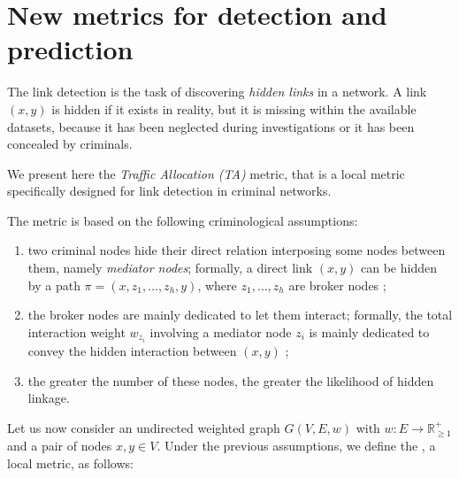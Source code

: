 \section{New metrics for detection and prediction}
\label{sec:new-metrics}

The link detection is the task of discovering \textit{hidden links} in a network. 
A link $(x,y)$ is hidden if it exists in reality, but it is missing within the available datasets, because it has been neglected during investigations or it has been concealed by criminals.

We present here the \textit{Traffic Allocation (TA)}  metric, that is a local metric specifically designed for link detection in criminal networks.
 
The metric is based on the following criminological assumptions: 

\begin{enumerate}
	\item two criminal nodes hide their direct relation interposing some nodes between them, namely \textit{mediator nodes}; formally, a direct link $(x,y)$ can be hidden by a path $\pi=(x,z_{1},\ldots,z_{h},y)$, where $z_{1},\ldots,z_{h}$ are broker nodes ;
	
	\item the broker nodes are mainly dedicated to let them interact; formally, the total interaction weight $w_{z_{i}}$ involving a mediator node $z_{i}$ is mainly dedicated to convey the hidden interaction between $(x,y)$ ;
	
	\item the greater the number of these nodes, the greater the likelihood of hidden linkage. 
\end{enumerate}

Let us now consider an undirected weighted graph $G(V,E,w)$ with $w:E\rightarrow\mathbb{R}_{\geq1}^{+}$ and a pair of nodes $x,y\in V$.
Under the previous assumptions, we define the , a local metric, as follows:

